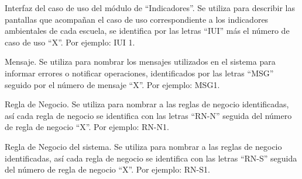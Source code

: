 \begin{description}
	     Interfaz del caso de uso del módulo de ``Indicadores''. Se utiliza para describir las pantallas que acompañan el caso de uso correspondiente a los indicadores ambientales de cada escuela, se identifica por las letras ``IUI'' más el número de caso de uso ``X''. Por ejemplo: IUI 1.


	     Mensaje. Se utiliza para nombrar los mensajes utilizados en el sistema para informar errores o notificar operaciones, identificados por las letras ``MSG'' seguido por el número de mensaje ``X''. Por ejemplo: MSG1.

	     Regla de Negocio. Se utiliza para nombrar a las reglas de negocio identificadas, así cada regla de negocio se identifica con las letras ``RN-N'' seguida del número de regla de negocio ``X''. Por ejemplo: RN-N1.

	     Regla de Negocio del sistema. Se utiliza para nombrar a las reglas de negocio identificadas, así cada regla de negocio se identifica con las letras ``RN-S'' seguida del número de regla de negocio ``X''. Por ejemplo: RN-S1.	

	\end{description}

